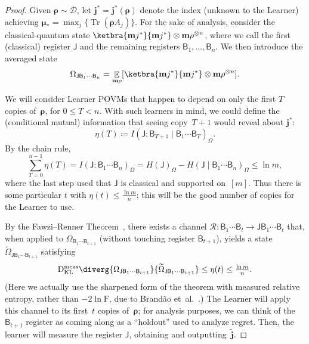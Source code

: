 \documentclass[10pt]{article}
\newcommand{\DKLmeas}[2]{\mathrm{D}_{\mathrm{KL}}^{\textnormal{meas}}\diverg{#1}{#2}}
\newcommand{\calD}{\mathcal{D}}
\newcommand{\wt}[1]{\widetilde{#1}}
\let\mathbm\bm
\newcommand{\bj}{\mathbm{j}}
\newcommand{\brho}{\mathbm{\rho}}
\newcommand{\bmu}{\mathbm{\mu}}
\DeclareMathOperator*{\EE}{\mathbb{E}}
\renewcommand{\bm}{\mathbf{m}}
\newcommand{\calR}{\mathcal{R}}
\DeclareMathOperator{\Tr}{Tr}
\begin{document}
\begin{proof}
    Given $\brho \sim \calD$, let $\bj^* = \bj^*(\brho)$ denote the index (unknown to the Learner) achieving $\bmu_* = \max_j\{\Tr(\brho A_j)\}$.
    For the sake of analysis, consider the classical-quantum state $\ketbra{\bj^*}{\bj^*} \otimes \brho^{\otimes n}$, where we call the first (classical) register $\mathsf{J}$ and the remaining registers $\mathsf{B}_1, \dots, \mathsf{B}_n$.  
    We then introduce the averaged state
    \begin{equation}
        \Omega_{\mathsf{J}\mathsf{B}_1\cdots \mathsf{B}_n} = \EE_{\brho}[\ketbra{\bj^*}{\bj^*} \otimes \brho^{\otimes n}].
    \end{equation}

    We will consider Learner POVMs that happen to depend on only the first $T$ copies of~$\brho$, for $0 \leq T < n$.  
    With such learners in mind, we could define the (conditional mutual) information that seeing copy~$T+1$ would reveal about $\bj^*$:
    \begin{equation}
        \eta(T) \coloneqq I(\mathsf{J} : \mathsf{B}_{T+1} \mid \mathsf{B}_1 \cdots \mathsf{B}_{T})_{\Omega}.
    \end{equation}
    By the chain rule, 
    \begin{equation}
        \sum_{T=0}^{n-1} \eta(T) = I(\mathsf{J} : \mathsf{B}_1 \cdots \mathsf{B}_{n})_{\Omega} = H(\mathsf{J})_\Omega - H(\mathsf{J} \mid \mathsf{B}_1 \cdots \mathsf{B}_{n})_\Omega \leq \ln m,
    \end{equation}
    where the last step used that $\mathsf{J}$ is classical and supported on~$[m]$.
    Thus there is some particular $t$ with $\eta(t) \leq \frac{\ln m}{n}$; this will be the good number of copies for the Learner to use.

    By the Fawzi--Renner Theorem~\cite{FR15}, there exists a channel $\calR : \mathsf{B}_1 \cdots \mathsf{B}_{t}\to \mathsf{J}\mathsf{B}_1 \cdots \mathsf{B}_{t}$ that, when applied to $\Omega_{\mathsf{B}_1 \cdots \mathsf{B}_{t+1}}$ (without touching register $\mathsf{B}_{t+1}$), yields a state $\wt{\Omega}_{\mathsf{J}\mathsf{B}_1\cdots\mathsf{B}_{t+1}}$ satisfying 
    \begin{equation} \label{eqn:dkl}
        \DKLmeas{\Omega_{\mathsf{J}\mathsf{B}_1\cdots\mathsf{B}_{t+1}}}{\wt{\Omega}_{\mathsf{J}\mathsf{B}_1\cdots\mathsf{B}_{t+1}}} \leq \eta(t) \leq \tfrac{\ln m}{n}.
    \end{equation}
    (Here we actually use the sharpened form of the theorem with measured relative entropy, rather than $-2 \ln \mathrm{F}$, due to Brand\~ao et~al.~\cite{BHOS15}.)
    The Learner will apply this channel to its first~$t$ copies of~$\brho$; for analysis purposes, we can think of the $\mathsf{B}_{t+1}$ register as coming along as a ``holdout'' used to analyze regret.
    Then, the learner will measure the register $\mathsf{J}$, obtaining and outputting~$\wt{\bj}$.


\end{proof}
\end{document}
